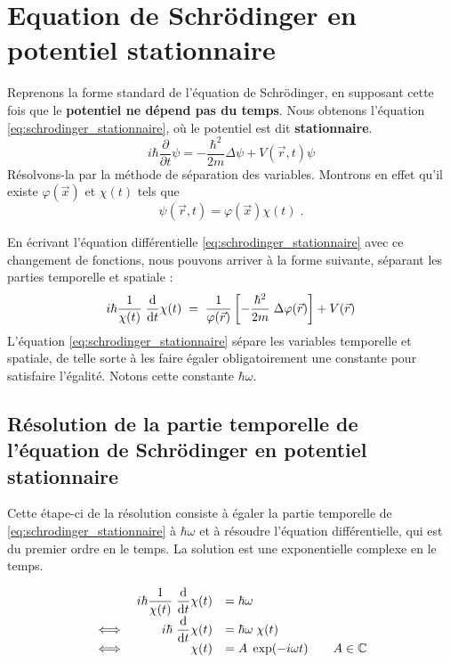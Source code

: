 \documentclass[12pt, a4paper]{book}
\begin{document}
\section{Equation de Schrödinger en potentiel stationnaire}
Reprenons la forme standard de l'équation de Schrödinger, en supposant cette fois que le \textbf{potentiel ne dépend pas du temps}. Nous obtenons l'équation \eqref{eq:schrodinger_stationnaire}, où le potentiel est dit \textbf{stationnaire}. 
\begin{equation} \label{eq:schrodinger_stationnaire}
i\hbar \dfrac{\partial}{\partial t} \psi = -\dfrac{\hbar ^2}{2m} \Delta \psi + V(\vec r, t) \psi
\end{equation}
Résolvons-la par la méthode de séparation des variables. Montrons en effet qu'il existe $\varphi(\vec x)$ et $\chi(t)$ tels que $$\psi(\vec r, t) = \varphi(\vec x) \chi(t)\; .$$

En écrivant l'équation différentielle \eqref{eq:schrodinger_stationnaire} avec ce changement de fonctions, nous pouvons arriver à la forme suivante, séparant les parties temporelle et spatiale :
\begin{equation}
i\hbar \dfrac{1}{\chi(t)} \; \dfrac{\mathrm{d}}{\mathrm{d}t} \chi(t) \; = \; \dfrac{1}{\varphi(\vec r)} \left[ -\dfrac{\hbar ^2}{2m} \; \Delta \varphi(\vec r) \right] + V(\vec r)
\end{equation}
L'équation \eqref{eq:schrodinger_stationnaire} sépare les variables temporelle et spatiale, de telle sorte à les faire égaler obligatoirement une constante pour satisfaire l'égalité. Notons cette constante $\hbar \omega$. 
\subsection{Résolution de la partie temporelle de l'équation de Schrödinger en potentiel stationnaire}
Cette étape-ci de la résolution consiste à égaler la partie temporelle de \eqref{eq:schrodinger_stationnaire} à $\hbar \omega$ et à résoudre l'équation différentielle, qui est du premier ordre en le temps. La solution est une exponentielle complexe en le temps.

\begin{equation} \label{eq:resol_stat_temps}
\begin{array}{lrl r}
& i\hbar \dfrac{1}{\chi(t)} \; \dfrac{\mathrm{d}}{\mathrm{d}t} \chi(t) &= \hbar \omega  &\\
\iff& i \hbar \; \dfrac{\mathrm{d}}{\mathrm{d}t} \chi(t) &= \hbar \omega \;  \chi(t)  &\\
\iff & \chi(t) &= A \; \exp(-i\omega t)  &\quad A \in \mathbb{C}
\end{array}
\end{equation}
\end{document}

